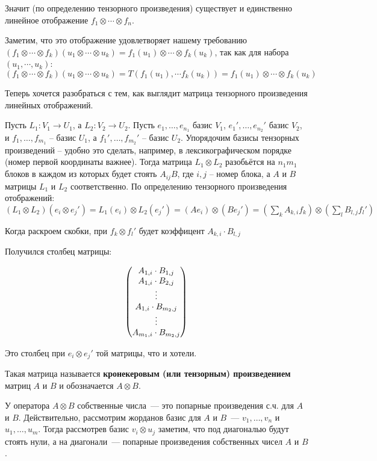		Значит (по определению тензорного произведения) существует и единственно линейное отображение $f_1\otimes\cdots\otimes f_n$. 

		Заметим, что это отображение удовлетворяет нашему требованию $(f_1\otimes\cdots\otimes f_k)(u_1\otimes\cdots\otimes u_k) = f_1(u_1)\otimes\cdots\otimes f_k(u_k)$, так как для набора $(u_1,\cdots,u_k)$: $(f_1\otimes\cdots\otimes f_k)(u_1\otimes\cdots\otimes u_k) = T(f_1(u_1),\cdots f_k(u_k)) = f_1(u_1)\otimes\cdots\otimes f_k(u_k)$ 
	\endproof
\elm

Теперь хочется разобраться с тем, как выглядит матрица тензорного произведения линейных отображений.

\lm
	Пусть $L_1 \colon V_1 \to U_1$, а $L_2 \colon V_2 \to U_2$. Пусть $e_1,\dots, e_{n_1}$ базис $V_1$,  $e_1',\dots, e_{n_2}'$ базис $V_2$,  и $f_1,\dots, f_{m_1}$ -- базис $U_1$, а $f_1',\dots, f_{m_2}'$ -- базис $U_2$. 
	Упорядочим базисы тензорных произведений -- удобно это сделать, например, в лексикографическом порядке (номер первой координаты важнее).
	Тогда матрица  $L_1\otimes L_2$  разобьётся на $n_1m_1$ блоков в каждом из которых будет стоять $ A_{ij} B$, где $i,j$ -- номер блока, а $A$ и $B$ матрицы $L_1$ и $L_2$ соответственно.
	\proof
		По определению тензорного произведения отображений: $(L_1\otimes L_2)(e_i\otimes e_j') = L_1(e_i)\otimes L_2(e_j') = (Ae_i)\otimes (Be_j') = (\sum\limits_{k} A_{k, i} f_k)\otimes(\sum\limits_{l} B_{l, j} f_l')$

		Когда раскроем скобки, при $f_k\otimes f_l'$ будет коэффицент $A_{k, i}\cdot B_{l, j}$

		Получился столбец матрицы:

		$$\begin{pmatrix}
		A_{1, i}\cdot B_{1, j}\\
		A_{1, i}\cdot B_{2, j}\\
		\vdots\\
		A_{1, i}\cdot B_{m_2, j}\\
		\vdots\\
		A_{m_1, i}\cdot B_{m_2, j}
		\end{pmatrix}$$

		Это столбец при $e_i\otimes e_j'$ той матрицы, что и хотели.
	\endproof
\elm

\dfn
	Такая матрица называется {\bf кронекеровым (или тензорным) произведением} матриц $A$ и $B$ и обозначается $A\otimes B$.
\edfn

\lm
	У оператора $A\otimes B$ собственные числа~--- это попарные произведения с.ч. для $A$ и $B$. 
	\proof 
		Действительно, рассмотрим жорданов базис для $A$ и $B$~--- $v_1,\dots,v_n$ и $u_1,\dots, u_m$. Тогда рассмотрев базис $v_i\otimes u_j$ заметим, что под диагональю будут стоять нули, а на диагонали~--- попарные произведения собственных чисел $A$ и $B$.
	\endproof
\elm

